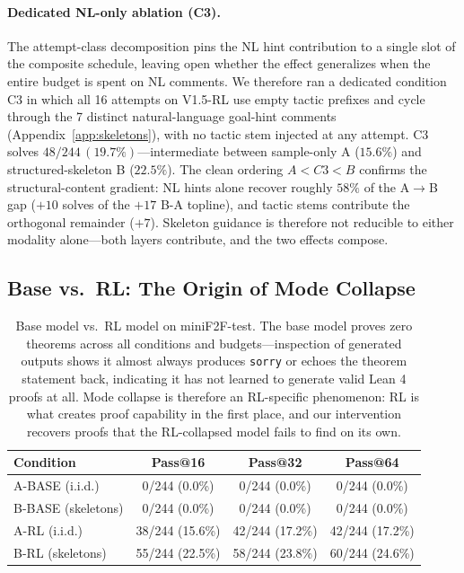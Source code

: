 \documentclass{article}
\begin{document}
\paragraph{Dedicated NL-only ablation (C3).}
The attempt-class decomposition pins the NL hint contribution to a single slot of the composite schedule, leaving open whether the effect generalizes when the entire budget is spent on NL comments. We therefore ran a dedicated condition C3 in which all 16 attempts on V1.5-RL use empty tactic prefixes and cycle through the 7 distinct natural-language goal-hint comments (Appendix~\ref{app:skeletons}), with no tactic stem injected at any attempt. C3 solves $48/244\,(19.7\%)$---intermediate between sample-only A ($15.6\%$) and structured-skeleton B ($22.5\%$). The clean ordering $A < C3 < B$ confirms the structural-content gradient: NL hints alone recover roughly $58\%$ of the A$\to$B gap ($+10$ solves of the $+17$ B-A topline), and tactic stems contribute the orthogonal remainder ($+7$). Skeleton guidance is therefore not reducible to either modality alone---both layers contribute, and the two effects compose.

\subsection{Base vs.\ RL: The Origin of Mode Collapse}
\label{sec:base_vs_rl}

\begin{table}[h]
\centering
\begin{tabular}{lccc}
\toprule
\textbf{Condition} & \textbf{Pass@16} & \textbf{Pass@32} & \textbf{Pass@64} \\
\midrule
A-BASE (i.i.d.) & 0/244 (0.0\%) & 0/244 (0.0\%) & 0/244 (0.0\%) \\
B-BASE (skeletons) & 0/244 (0.0\%) & 0/244 (0.0\%) & 0/244 (0.0\%) \\
\midrule
A-RL (i.i.d.) & 38/244 (15.6\%) & 42/244 (17.2\%) & 42/244 (17.2\%) \\
B-RL (skeletons) & 55/244 (22.5\%) & 58/244 (23.8\%) & 60/244 (24.6\%) \\
\bottomrule
\end{tabular}
\caption{Base model vs.\ RL model on miniF2F-test. The base model proves zero theorems across all conditions and budgets---inspection of generated outputs shows it almost always produces \texttt{sorry} or echoes the theorem statement back, indicating it has not learned to generate valid Lean 4 proofs at all. Mode collapse is therefore an RL-specific phenomenon: RL is what creates proof capability in the first place, and our intervention recovers proofs that the RL-collapsed model fails to find on its own.}
\label{tab:base}
\end{table}
\end{document}
